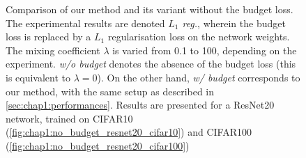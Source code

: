 \begin{figure}
  \centering
    \caption{ Comparison of our method and its variant without the
    budget loss. The experimental results are denoted \emph{$L_1$ reg.}, wherein
    the budget loss is replaced by a $L_1$ regularisation loss on the network
    weights. The mixing coefficient $\lambda$ is varied from 0.1 to 100,
    depending on the experiment. \emph{w/o budget} denotes the absence of the
    budget loss (this is equivalent to $\lambda = 0$). On the other hand,
    \emph{w/ budget} corresponds to our method, with the same setup as described
    in \cref{sec:chap1:performances}. Results are presented for a ResNet20
    network, trained on CIFAR10 (\cref{fig:chap1:no_budget_resnet20_cifar10})
    and CIFAR100 (\cref{fig:chap1:no_budget_resnet20_cifar100})}       
    \label{fig:chap1:no_budget_resnet20}
\end{figure}
  
    

